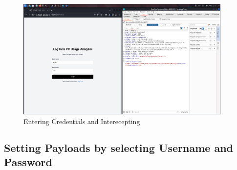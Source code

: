\documentclass[11pt]{article}
\begin{document}
\begin{figure}[H]
    \centering
    \includegraphics[width=0.95\textwidth]{burpsuite (3).png}
    \caption{Entering Credentials and Interecepting}
    \label{fig:1}
\end{figure}
\subsection{Setting Payloads by selecting Username and Password}



\end{document}
